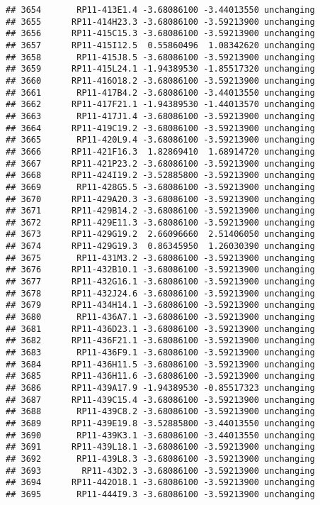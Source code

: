 \documentclass[]{article}
\begin{document}
\begin{verbatim}
## 3654       RP11-413E1.4 -3.68086100 -3.44013550 unchanging
## 3655      RP11-414H23.3 -3.68086100 -3.59213900 unchanging
## 3656      RP11-415C15.3 -3.68086100 -3.59213900 unchanging
## 3657      RP11-415I12.5  0.55860496  1.08342620 unchanging
## 3658       RP11-415J8.5 -3.68086100 -3.59213900 unchanging
## 3659      RP11-415L24.1 -1.94389530 -1.85517320 unchanging
## 3660      RP11-416O18.2 -3.68086100 -3.59213900 unchanging
## 3661       RP11-417B4.2 -3.68086100 -3.44013550 unchanging
## 3662      RP11-417F21.1 -1.94389530 -1.44013570 unchanging
## 3663       RP11-417J1.4 -3.68086100 -3.59213900 unchanging
## 3664      RP11-419C19.2 -3.68086100 -3.59213900 unchanging
## 3665       RP11-420L9.4 -3.68086100 -3.59213900 unchanging
## 3666      RP11-421F16.3  1.82869410  1.68914720 unchanging
## 3667      RP11-421P23.2 -3.68086100 -3.59213900 unchanging
## 3668      RP11-424I19.2 -3.52885800 -3.59213900 unchanging
## 3669       RP11-428G5.5 -3.68086100 -3.59213900 unchanging
## 3670      RP11-429A20.3 -3.68086100 -3.59213900 unchanging
## 3671      RP11-429B14.2 -3.68086100 -3.59213900 unchanging
## 3672      RP11-429E11.3 -3.68086100 -3.59213900 unchanging
## 3673      RP11-429G19.2  2.66096660  2.51406050 unchanging
## 3674      RP11-429G19.3  0.86345950  1.26030390 unchanging
## 3675       RP11-431M3.2 -3.68086100 -3.59213900 unchanging
## 3676      RP11-432B10.1 -3.68086100 -3.59213900 unchanging
## 3677      RP11-432G16.1 -3.68086100 -3.59213900 unchanging
## 3678      RP11-432J24.6 -3.68086100 -3.59213900 unchanging
## 3679      RP11-434H14.1 -3.68086100 -3.59213900 unchanging
## 3680       RP11-436A7.1 -3.68086100 -3.59213900 unchanging
## 3681      RP11-436D23.1 -3.68086100 -3.59213900 unchanging
## 3682      RP11-436F21.1 -3.68086100 -3.59213900 unchanging
## 3683       RP11-436F9.1 -3.68086100 -3.59213900 unchanging
## 3684      RP11-436H11.5 -3.68086100 -3.59213900 unchanging
## 3685      RP11-436H11.6 -3.68086100 -3.59213900 unchanging
## 3686      RP11-439A17.9 -1.94389530 -0.85517323 unchanging
## 3687      RP11-439C15.4 -3.68086100 -3.59213900 unchanging
## 3688       RP11-439C8.2 -3.68086100 -3.59213900 unchanging
## 3689      RP11-439E19.8 -3.52885800 -3.44013550 unchanging
## 3690       RP11-439K3.1 -3.68086100 -3.44013550 unchanging
## 3691      RP11-439L18.1 -3.68086100 -3.59213900 unchanging
## 3692       RP11-439L8.3 -3.68086100 -3.59213900 unchanging
## 3693        RP11-43D2.3 -3.68086100 -3.59213900 unchanging
## 3694      RP11-442O18.1 -3.68086100 -3.59213900 unchanging
## 3695       RP11-444I9.3 -3.68086100 -3.59213900 unchanging

\end{verbatim}
\end{document}
